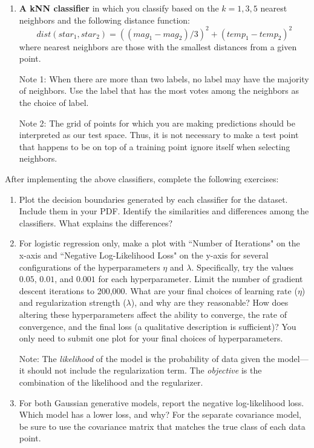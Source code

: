 \documentclass[submit]{harvardml}
\begin{document}
\begin{problem}
\begin{enumerate}[label=\alph*)]
\item \textbf{A kNN classifier} in which you classify based on the $k=1,3,5$ nearest neighbors and the following distance function: $$dist(star_1, star_2) = ((mag_1 - mag_2)/3)^2 + (temp_1 - temp_2)^2$$
where nearest neighbors are those with the smallest distances from a given point.

  Note 1: When there are more than two labels, no label may have the
  majority of neighbors.  Use the label that has the most votes among
  the neighbors as the choice of label. 

  Note 2: The grid of points for which you are making predictions
  should be interpreted as our test space.  Thus, it is not necessary
  to make a test point that happens to be on top of a training point
  ignore itself when selecting neighbors.

\end{enumerate}

After implementing the above classifiers, complete the following exercises:

\begin{enumerate}
    \item Plot the decision boundaries generated by each classifier for the dataset. Include them in your PDF. 
    Identify the similarities and differences among the classifiers. What explains the differences?

    \item For logistic regression only, make a plot with ``Number of
      Iterations" on the x-axis and ``Negative Log-Likelihood Loss" on
      the y-axis for several configurations of the hyperparameters
      $\eta$ and $\lambda$.  Specifically, try the values $0.05$,
      $0.01$, and $0.001$ for each hyperparameter.  Limit the number
      of gradient descent iterations to 200,000.  What are your final
      choices of learning rate ($\eta$) and regularization strength
      ($\lambda$), and why are they reasonable? How does altering
      these hyperparameters affect the ability to converge, the rate
      of convergence, and the final loss (a qualitative description is
      sufficient)? You only need to submit one plot for your final
      choices of hyperparameters.

      Note: The \emph{likelihood} of the model is the probability of
      data given the model---it should not include the regularization
      term.  The \emph{objective} is the combination of the likelihood
      and the regularizer.
      
    \item For both Gaussian generative models, report the negative log-likelihood loss. Which model has a lower loss, and why?
      For the separate covariance model, be sure to use
      the covariance matrix that matches the true class of each data
      point.
    

\end{enumerate}
\end{problem}
\end{document}
